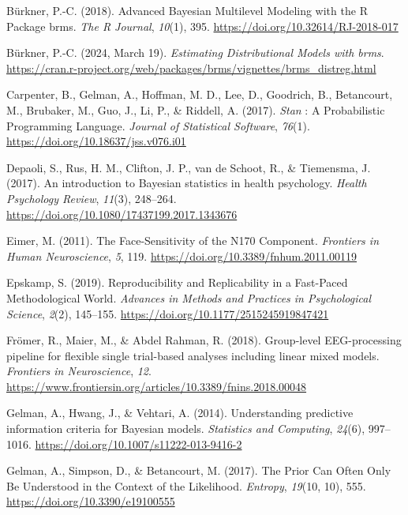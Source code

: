 \documentclass[
  doc,12pt,floatsintext]{apa7}
\newlength{\cslhangindent}
\newenvironment{CSLReferences}[2] %
 {\begin{list}{}{%
  \setlength{\itemindent}{0pt}
  \setlength{\leftmargin}{0pt}
  \setlength{\parsep}{0pt}
  \ifodd #1
   \setlength{\leftmargin}{\cslhangindent}
   \setlength{\itemindent}{-1\cslhangindent}
  \fi
  \setlength{\itemsep}{#2\baselineskip}}}
 {\end{list}}
\begin{document}
\begin{CSLReferences}{1}{0}
Bürkner, P.-C. (2018). Advanced {Bayesian Multilevel Modeling} with the {R Package} brms. \emph{The R Journal}, \emph{10}(1), 395. \url{https://doi.org/10.32614/RJ-2018-017}

Bürkner, P.-C. (2024, March 19). \emph{Estimating {Distributional Models} with brms}. \url{https://cran.r-project.org/web/packages/brms/vignettes/brms_distreg.html}

Carpenter, B., Gelman, A., Hoffman, M. D., Lee, D., Goodrich, B., Betancourt, M., Brubaker, M., Guo, J., Li, P., \& Riddell, A. (2017). \emph{Stan} : {A Probabilistic Programming Language}. \emph{Journal of Statistical Software}, \emph{76}(1). \url{https://doi.org/10.18637/jss.v076.i01}

Depaoli, S., Rus, H. M., Clifton, J. P., van de Schoot, R., \& Tiemensma, J. (2017). An introduction to {Bayesian} statistics in health psychology. \emph{Health Psychology Review}, \emph{11}(3), 248--264. \url{https://doi.org/10.1080/17437199.2017.1343676}

Eimer, M. (2011). The {Face-Sensitivity} of the {N170 Component}. \emph{Frontiers in Human Neuroscience}, \emph{5}, 119. \url{https://doi.org/10.3389/fnhum.2011.00119}

Epskamp, S. (2019). Reproducibility and {Replicability} in a {Fast-Paced Methodological World}. \emph{Advances in Methods and Practices in Psychological Science}, \emph{2}(2), 145--155. \url{https://doi.org/10.1177/2515245919847421}

Frömer, R., Maier, M., \& Abdel Rahman, R. (2018). Group-level {EEG-processing} pipeline for flexible single trial-based analyses including linear mixed models. \emph{Frontiers in Neuroscience}, \emph{12}. \url{https://www.frontiersin.org/articles/10.3389/fnins.2018.00048}

Gelman, A., Hwang, J., \& Vehtari, A. (2014). Understanding predictive information criteria for {Bayesian} models. \emph{Statistics and Computing}, \emph{24}(6), 997--1016. \url{https://doi.org/10.1007/s11222-013-9416-2}

Gelman, A., Simpson, D., \& Betancourt, M. (2017). The {Prior Can Often Only Be Understood} in the {Context} of the {Likelihood}. \emph{Entropy}, \emph{19}(10, 10), 555. \url{https://doi.org/10.3390/e19100555}


\end{CSLReferences}
\end{document}
